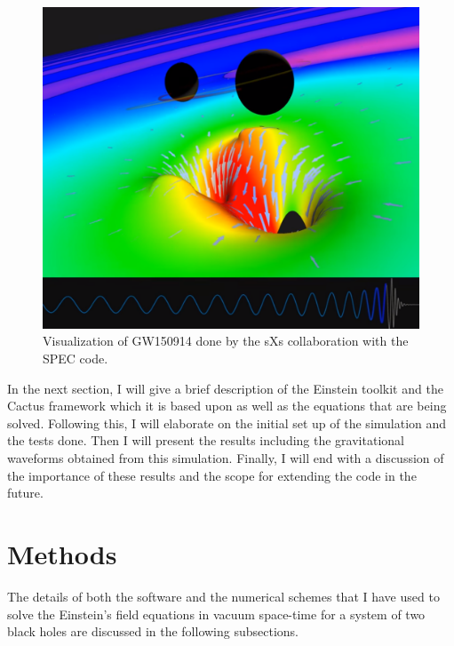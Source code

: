 \documentclass[aps,twocolumn,secnumarabic,nobalancelastpage,amsmath,amssymb,
nofootinbib]{revtex4}
\begin{document}
		\begin{figure}[h]
			\includegraphics[width=\linewidth]{spec.png}
			\caption{Visualization of GW150914 done by the sXs collaboration with the SPEC code. \cite{sxs}}
			\label{sxs}
		\end{figure}
	
	In the next section, I will give a brief description of the Einstein toolkit and the Cactus framework which it is based upon as well as the equations that are being solved. Following this, I will elaborate on the initial set up of the simulation and the tests done. Then I will present the results including the gravitational waveforms obtained from this simulation. Finally, I will end with a discussion of the importance of these results and the scope for extending the code in the future.
	
	
	
	\section{Methods}
	 The details of both the software and the numerical schemes that I have used to solve the Einstein's field equations in vacuum space-time for a system of two black holes are discussed in the following subsections.
\end{document}
